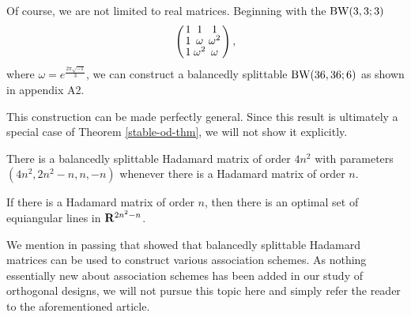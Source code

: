 \documentclass[../../../main]{subfiles}
\begin{document}
\begin{ex}
  Of course, we are not limited to real matrices. Beginning with the $\text{BW}(3,3;3)$
  \begin{equation}\label{bw3}
    \left(
      \arraycolsep=1.25pt\def\arraystretch{0.625}
      \begin{array}{ccc}
        1 & 1 & 1 \\
        1 & \omega & \omega^2 \\
        1 & \omega^2 & \omega
      \end{array}
    \right),
  \end{equation}
  where $\omega = e^\frac{2\pi\sqrt{-1}}{3}$, we can construct a balancedly
  splittable $\text{BW}(36,36;6)$ as shown in appendix A2.
\end{ex}

This construction can be made perfectly general. Since this result is ultimately a special case of Theorem \ref{stable-od-thm}, we will not show it explicitly.

\begin{thm}\label{stable-hadamard}
 There is a balancedly splittable Hadamard matrix of order $4n^2$ with parameters $(4n^2,2n^2-n,n,-n)$ whenever there is a Hadamard matrix of order $n$.
\end{thm}

\begin{cor}\label{optimal-lines-cor}
 If there is a Hadamard matrix of order $n$, then there is an optimal set of equiangular lines in $\mathbf{R}^{2n^2-n}$.
\end{cor}
 
 We mention in passing that \cite{splittable-hadamard} showed that balancedly splittable Hadamard matrices can be used to construct various association schemes. As nothing essentially new about association schemes has been added in our study of orthogonal designs, we will not pursue this topic here and simply refer the reader to the aforementioned article.
 
\biblio
\end{document}
